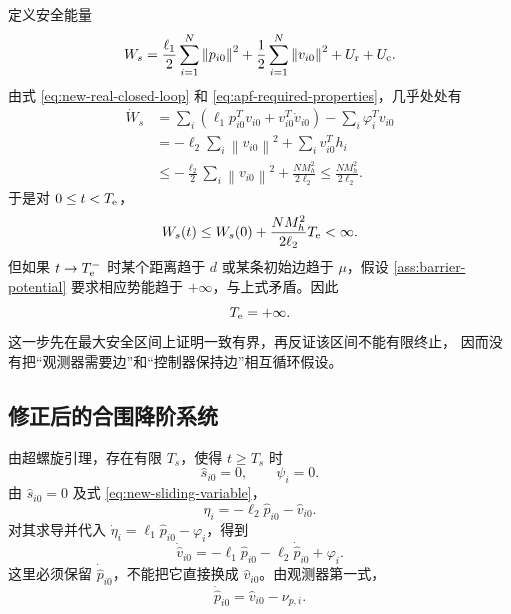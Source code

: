 \documentclass[UTF8,a4paper,12pt]{ctexart}
\newcommand{\norm}[1]{\left\lVert #1\right\rVert}
\begin{document}
定义安全能量
\begin{equation}
 W_s=\frac{\ell_1}{2}\sum_{i=1}^N\norm{p_{i0}}^2
 +\frac12\sum_{i=1}^N\norm{v_{i0}}^2+U_{\rm r}+U_{\rm c}.
 \label{eq:new-safety-energy}
\end{equation}
由式 \eqref{eq:new-real-closed-loop} 和
\eqref{eq:apf-required-properties}，几乎处处有
\begin{align}
 \dot W_s
 &=\sum_i\left(\ell_1p_{i0}^Tv_{i0}
 +v_{i0}^T\dot v_{i0}\right)
 -\sum_i\varphi_i^Tv_{i0}\\
 &=-\ell_2\sum_i\norm{v_{i0}}^2+\sum_i v_{i0}^Th_i\\
 &\le-\frac{\ell_2}{2}\sum_i\norm{v_{i0}}^2
 +\frac{N M_h^2}{2\ell_2}
 \le \frac{N M_h^2}{2\ell_2}.
 \label{eq:new-safety-derivative}
\end{align}
于是对 $0\le t<T_{\rm e}$，
\begin{equation}
 W_s(t)\le W_s(0)+\frac{N M_h^2}{2\ell_2}T_{\rm e}<\infty.
\end{equation}
但如果 $t\to T_{\rm e}^{-}$ 时某个距离趋于 $d$ 或某条初始边趋于
$\mu$，假设 \ref{ass:barrier-potential} 要求相应势能趋于
$+\infty$，与上式矛盾。因此
\begin{equation}
 T_{\rm e}=+\infty.
 \label{eq:no-exit}
\end{equation}
这一步先在最大安全区间上证明一致有界，再反证该区间不能有限终止，
因而没有把``观测器需要边''和``控制器保持边''相互循环假设。

\subsection{修正后的合围降阶系统}

由超螺旋引理，存在有限 $T_s$，使得 $t\ge T_s$ 时
\begin{equation}
 \hat s_{i0}=0,\qquad \psi_i=0.
\end{equation}
由 $\hat s_{i0}=0$ 及式 \eqref{eq:new-sliding-variable}，
\begin{equation}
 \eta_i=-\ell_2\hat p_{i0}-\hat v_{i0}.
\end{equation}
对其求导并代入 $\dot\eta_i=\ell_1\hat p_{i0}-\varphi_i$，得到
\begin{equation}
 \dot{\hat v}_{i0}
 =-\ell_1\hat p_{i0}-\ell_2\dot{\hat p}_{i0}+\varphi_i.
 \label{eq:corrected-reduced-agent}
\end{equation}
这里必须保留 $\dot{\hat p}_{i0}$，不能把它直接换成
$\hat v_{i0}$。由观测器第一式，
\begin{equation}
 \dot{\hat p}_{i0}=\hat v_{i0}-\nu_{p,i}.
 \label{eq:observer-kinematic-correction}
\end{equation}
\end{document}
